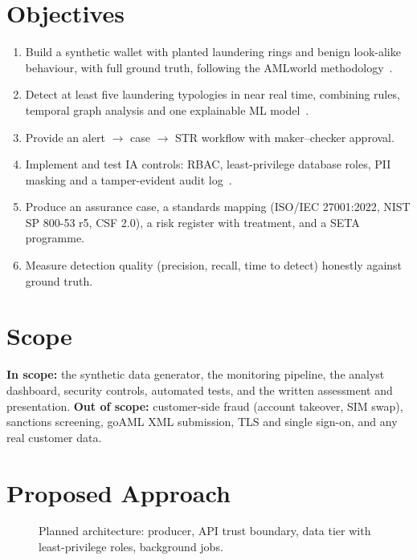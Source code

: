 \documentclass[conference,10pt]{IEEEtran}
\begin{document}
\section{Objectives}
\begin{enumerate}
  \item Build a synthetic wallet with planted laundering rings and benign look-alike behaviour,
        with full ground truth, following the AMLworld methodology~\cite{altman2023amlworld}.
  \item Detect at least five laundering typologies in near real time, combining rules, temporal
        graph analysis and one explainable ML model~\cite{chen2016xgboost,lundberg2017shap}.
  \item Provide an alert $\rightarrow$ case $\rightarrow$ STR workflow with maker--checker approval.
  \item Implement and test IA controls: RBAC, least-privilege database roles, PII masking and a
        tamper-evident audit log~\cite{sandhu1996rbac,clarkwilson1987,schneier1999audit}.
  \item Produce an assurance case, a standards mapping (ISO/IEC 27001:2022, NIST SP 800-53 r5,
        CSF 2.0), a risk register with treatment, and a SETA programme.
  \item Measure detection quality (precision, recall, time to detect) honestly against ground truth.
\end{enumerate}

\section{Scope}
\textbf{In scope:} the synthetic data generator, the monitoring pipeline, the analyst dashboard,
security controls, automated tests, and the written assessment and presentation.
\textbf{Out of scope:} customer-side fraud (account takeover, SIM swap), sanctions screening, goAML
XML submission, TLS and single sign-on, and any real customer data.

\section{Proposed Approach}

\begin{figure}[t]
  \centering
  \resizebox{\columnwidth}{!}{}
  \caption{Planned architecture: producer, API trust boundary, data tier with least-privilege roles,
  background jobs.}
  \label{fig:arch}
\end{figure}
\end{document}
